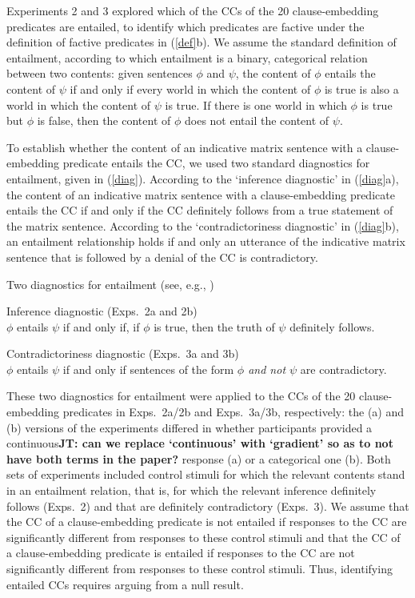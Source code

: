 \documentclass[11pt,fleqn]{article}
\newcommand{\6}{\mbox{$[\hspace*{-.6mm}[$}}
\newcommand{\9}{\mbox{$]\hspace*{-.6mm}]$}}
\newcommand{\jt}[1]{\textbf{\color{blue}JT: #1}}
\begin{document}
Experiments 2 and 3 explored which of the CCs of the 20 clause-embedding predicates are entailed, to identify which predicates are factive under the definition of factive predicates in (\ref{def}b). We assume the standard definition of entailment, according to which entailment is a binary, categorical relation between two contents: given sentences $\phi$ and $\psi$, the content of $\phi$ entails the content of $\psi$ if and only if every world in which the content of $\phi$ is true is also a world in which the content of $\psi$ is true. If there is one world in which $\phi$ is true but $\phi$ is false, then the content of $\phi$ does not entail the content of $\psi$. 

To establish whether the content of an indicative matrix sentence with a clause-embedding predicate entails the CC, we used two standard diagnostics for entailment, given in (\ref{diag}). According to the `inference diagnostic' in (\ref{diag}a), the content of an indicative matrix sentence with a clause-embedding predicate entails the CC if and only if the CC definitely follows from a true statement of the matrix sentence. According to the `contradictoriness diagnostic' in (\ref{diag}b), an entailment relationship holds if and only an utterance of the indicative matrix sentence that is followed by a denial of the CC is contradictory. 

\begin{exe}
\ex\label{diag} Two diagnostics for entailment \hfill (see, e.g., \citealt[\S3.1]{ccmg90})
\begin{xlist}
\ex  Inference diagnostic (Exps.~2a and 2b)\\ $\phi$ entails $\psi$ if and only if, if $\phi$ is true, then the truth of $\psi$ definitely follows. 

\ex  Contradictoriness diagnostic  (Exps.~3a and 3b)\\ $\phi$ entails $\psi$ if and only if sentences of the form {\em $\phi$ and not $\psi$} are contradictory. 

\end{xlist}
\end{exe}
These two diagnostics for entailment were applied to the CCs of the 20 clause-embedding predicates in Exps.~2a/2b and Exps.~3a/3b, respectively: the (a) and (b) versions of the experiments differed in whether participants provided a continuous\jt{can we replace `continuous' with `gradient' so as to not have both terms in the paper?} response (a) or a categorical one (b).  Both sets of experiments included control stimuli for which the relevant contents stand in an entailment relation, that is, for which the relevant inference definitely follows (Exps.~2) and that are definitely contradictory (Exps.~3). We assume that the CC of a clause-embedding predicate is not entailed if responses to the CC are significantly different from responses to these control stimuli and that the CC of a clause-embedding predicate is entailed if responses to the CC are not significantly different from responses to these control stimuli. Thus, identifying entailed CCs  requires arguing from a null result. 
\end{document}
